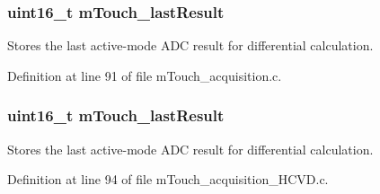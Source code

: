 \hypertarget{group___acquisition_ga6890b3a94dbdd045d66ec2b025cddda6}{}
\subsubsection[{m\+Touch\+\_\+last\+Result}]{\setlength{\rightskip}{0pt plus 5cm}uint16\+\_\+t m\+Touch\+\_\+last\+Result}\label{group___acquisition_ga6890b3a94dbdd045d66ec2b025cddda6}


Stores the last active-\/mode A\+D\+C result for differential calculation. 



Definition at line 91 of file m\+Touch\+\_\+acquisition.\+c.

\hypertarget{group___acquisition_ga6890b3a94dbdd045d66ec2b025cddda6}{}
\subsubsection[{m\+Touch\+\_\+last\+Result}]{\setlength{\rightskip}{0pt plus 5cm}uint16\+\_\+t m\+Touch\+\_\+last\+Result}\label{group___acquisition_ga6890b3a94dbdd045d66ec2b025cddda6}


Stores the last active-\/mode A\+D\+C result for differential calculation. 



Definition at line 94 of file m\+Touch\+\_\+acquisition\+\_\+\+H\+C\+V\+D.\+c.

